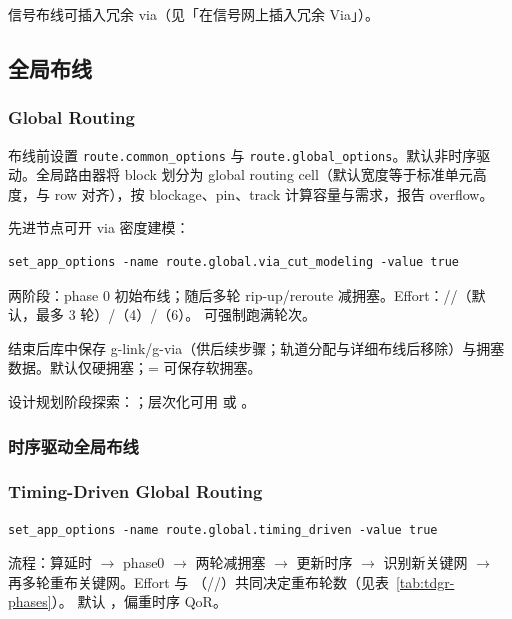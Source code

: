 信号布线可插入冗余 via（见「在信号网上插入冗余 Via」）。

\subsection{全局布线}
\subsubsection*{Global Routing}

布线前设置 \texttt{route.common\_options} 与 \texttt{route.global\_options}。默认非时序驱动。全局路由器将 block 划分为 global routing cell（默认宽度等于标准单元高度，与 row 对齐），按 blockage、pin、track 计算容量与需求，报告 overflow。

先进节点可开 via 密度建模：
\begin{lstlisting}
set_app_options -name route.global.via_cut_modeling -value true
\end{lstlisting}

两阶段：phase 0 初始布线；随后多轮 rip-up/reroute 减拥塞。Effort：//（默认，最多 3 轮）/（4）/（6）。 可强制跑满轮次。

结束后库中保存 g-link/g-via（供后续步骤；轨道分配与详细布线后移除）与拥塞数据。默认仅硬拥塞；= 可保存软拥塞。

设计规划阶段探索：；层次化可用  或 。

\subsubsection{时序驱动全局布线}
\subsubsection*{Timing-Driven Global Routing}

\begin{lstlisting}
set_app_options -name route.global.timing_driven -value true
\end{lstlisting}
流程：算延时 $\rightarrow$ phase0 $\rightarrow$ 两轮减拥塞 $\rightarrow$ 更新时序 $\rightarrow$ 识别新关键网 $\rightarrow$ 再多轮重布关键网。Effort 与 （//）共同决定重布轮数（见表~\ref{tab:tdgr-phases}）。 默认 ，偏重时序 QoR。

